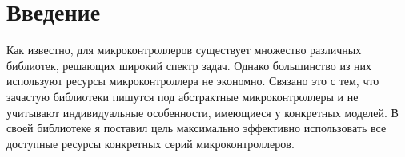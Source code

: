 \chapter{Введение}
Как известно, для микроконтроллеров существует множество различных библиотек, решающих широкий спектр задач. Однако большинство из них используют ресурсы микроконтроллера не экономно. Связано это с тем, что зачастую библиотеки пишутся под абстрактные микроконтроллеры и не учитывают индивидуальные  особенности, имеющиеся у конкретных моделей. В своей библиотеке я поставил цель максимально эффективно использовать все доступные ресурсы конкретных серий микроконтроллеров.